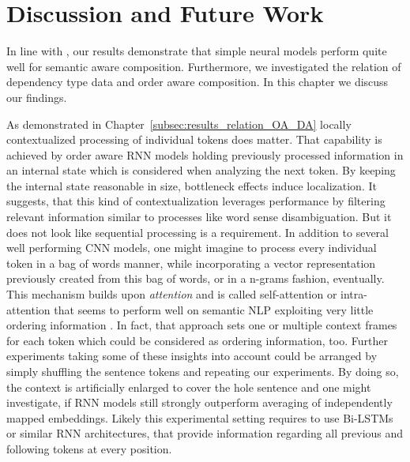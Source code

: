 \section{Discussion and Future Work}

In line with \textcite{mueller_siamese_2016,iyyer_deep_2015}, our results demonstrate that simple neural models perform quite well for semantic aware composition. Furthermore, we investigated the relation of dependency type data and order aware composition. In this chapter we discuss our findings.%

As demonstrated in Chapter~\ref{subsec:results_relation_OA_DA} locally contextualized processing of individual tokens does matter. That capability is achieved by order aware \ac{RNN} models holding previously processed information in an internal state which is considered when analyzing the next token. By keeping the internal state reasonable in size, bottleneck effects induce localization. It suggests, that this kind of contextualization leverages performance by filtering relevant information similar to processes like word sense disambiguation. But it does not look like sequential processing is a requirement. In addition to several well performing \ac{CNN} models, one might imagine to process every individual token in a bag of words manner, while incorporating a vector representation previously created from this bag of words, or in a n-grams fashion, eventually. This mechanism builds upon \textit{attention} \autocite{bahdanau_neural_2014, vaswani_attention_2017} and is called self-attention or intra-attention \autocite{cheng_long_2016} that seems to perform well on semantic \ac{NLP} exploiting very little %
ordering information \autocite{parikh_decomposable_2016}. In fact, that approach sets one or multiple context frames for each token which could be considered as ordering information, too. %
Further experiments taking some of these insights into account could be arranged by simply shuffling the sentence tokens and repeating our experiments. By doing so, the context is artificially enlarged to cover the hole sentence and one might investigate, if \ac{RNN} models still strongly outperform averaging of independently mapped embeddings. Likely this experimental setting requires to use Bi-LSTMs \autocite{graves_speech_2013} or similar \ac{RNN} architectures, that provide information regarding all previous and following tokens at every position.

